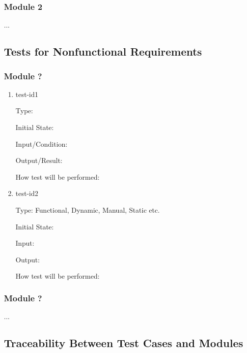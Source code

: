 \documentclass[12pt, titlepage]{article}
\begin{document}
\subsubsection{Module 2}

...

\subsection{Tests for Nonfunctional Requirements}

\subsubsection{Module ?}
		
\begin{enumerate}

\item{test-id1\\}

Type: 
					
Initial State: 
					
Input/Condition: 
					
Output/Result: 
					
How test will be performed: 
					
\item{test-id2\\}

Type: Functional, Dynamic, Manual, Static etc.
					
Initial State: 
					
Input: 
					
Output: 
					
How test will be performed: 

\end{enumerate}

\subsubsection{Module ?}

...

\subsection{Traceability Between Test Cases and Modules}

				

\end{document}

